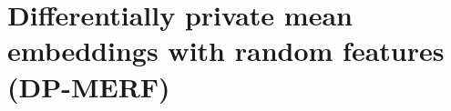 \documentclass{article}
\newcommand{\mpsay}[1]{[\textbf{MP:} \textcolor{red!60!black}{#1}]}
\begin{document}


\section{Differentially private mean embeddings with random features (DP-MERF)}
\label{sec:Methods}



\end{document}
